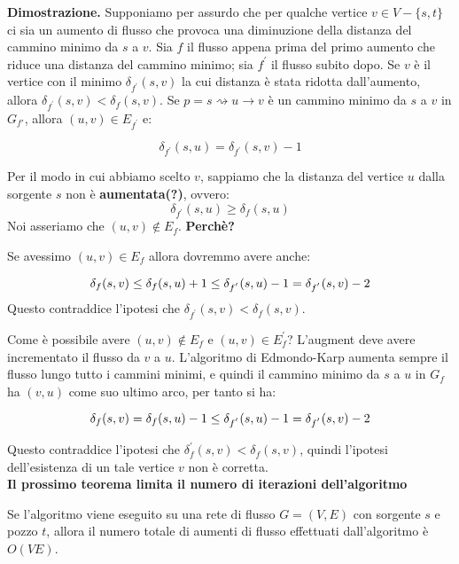 \textbf{Dimostrazione.} Supponiamo per assurdo che per qualche vertice $v \in V - \{s, t\}$ ci sia un aumento di flusso che provoca una diminuzione della distanza del cammino minimo da $s$ a $v$. Sia $f$ il flusso appena prima del primo aumento che riduce una distanza del cammino minimo;
sia $f^{'}$ il flusso subito dopo. Se $v$ è il vertice con il minimo $\delta_{f^{'}}(s,v)$ la cui distanza è stata ridotta dall'aumento, allora $\delta_{f^{'}}(s,v) < \delta_{f}(s,v)$.
Se $p = s \rightsquigarrow u \rightarrow v$ è un cammino minimo da $s$ a $v$ in $G_{f{'}}$, allora
$(u,v) \in E_{f^{'}}$ e:

$$
    \delta_{f^{'}}(s,u) = \delta_{f^{'}}(s,v) -1
$$

Per il modo in cui abbiamo scelto $v$, sappiamo che la distanza del vertice $u$ dalla sorgente $s$ non è \textbf{aumentata(?)}, ovvero:
$$
    \delta_{f^{'}}(s,u) \ge \delta_{f}(s,u)
$$
Noi asseriamo che $(u,v) \notin E_f$. \textbf{Perchè?}

Se avessimo $(u,v) \in E_f$ allora dovremmo avere anche:

$$
    \delta_{f}(s,v) \le \delta_{f}(s,u) +1 \\
    \le \delta_{f^{'}}(s,u) -1 \\
    = \delta_{f^{'}}(s,v) -2
$$
Questo contraddice l'ipotesi che $\delta_{f^{'}}(s,v) < \delta_{f}(s,v)$.

Come è possibile avere $(u,v) \notin E_f$ e $(u,v) \in E_f^{'}$?
L'augment deve avere incrementato il flusso da $v$ a $u$. L'algoritmo di Edmondo-Karp aumenta sempre il flusso lungo tutto i cammini minimi, e quindi il cammino minimo da $s$ a $u$ in $G_f$ ha $(v,u)$ come suo ultimo arco, per tanto si ha:

$$
    \delta_{f}(s,v) = \delta_{f}(s,u) -1 \\
    \le \delta_{f^{'}}(s,u) -1 \\
    = \delta_{f^{'}}(s,v) -2
$$

Questo contraddice l'ipotesi che $\delta_f^{'}(s,v) < \delta_f(s,v)$, quindi l'ipotesi dell'esistenza di un tale vertice $v$ non è corretta.\\

\newpage
\textbf{Il prossimo teorema limita il numero di iterazioni dell'algoritmo}

\begin{myblockquote}
    Se l'algoritmo viene eseguito su una rete di flusso $G = (V, E)$ con
    sorgente $s$ e pozzo $t$, allora il numero totale di aumenti di flusso
    effettuati dall'algoritmo è $O(VE)$.
\end{myblockquote}

